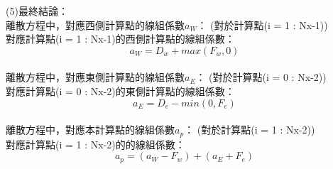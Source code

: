 \documentclass[12pt]{article}
\begin{document}
\noindent (5)最終結論：\\

\noindent 離散方程中，對應西側計算點的線組係數$a_{W}$：
    (對於計算點(i = 1 : Nx-1))\\
    對應計算點(i = 1 : Nx-1)的西側計算點的線組係數：\\
\begin{equation}a_{W}  = D_{w} + max(F_{w},0)\end{equation}\\
    離散方程中，對應東側計算點的線組係數$a_{E}$：
    (對於計算點(i = 0 : Nx-2))\\
    對應計算點(i = 0 : Nx-2)的東側計算點的線組係數：\\
\begin{equation}a_{E}  = D_{e} - min(0,F_{e})\end{equation}\\
    離散方程中，對應本計算點的線組係數$a_{p}$：
    (對於計算點(i = 1 : Nx-2))\\
    對應計算點(i = 1 : Nx-2)的的線組係數：\\
\begin{equation}a_{p}  = (a_{W} - F_{w}) + (a_{E} + F_{e}) \end{equation}\\
\end{document}
